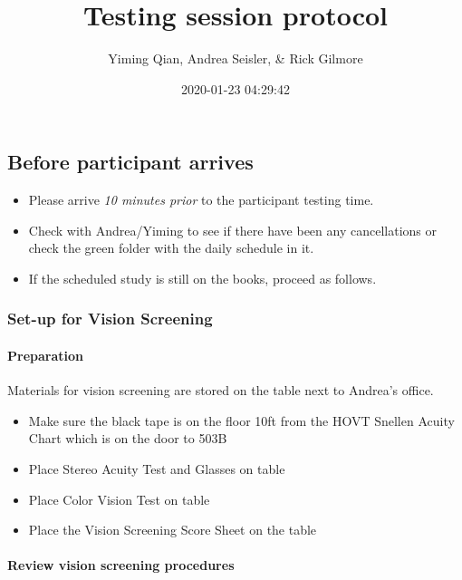 \documentclass[]{article}
\title{Testing session protocol}
\author{Yiming Qian, Andrea Seisler, \& Rick Gilmore}
\date{2020-01-23 04:29:42}
\providecommand{\tightlist}{%
  \setlength{\itemsep}{0pt}\setlength{\parskip}{0pt}}
\let\oldparagraph\paragraph
\renewcommand{\paragraph}[1]{\oldparagraph{#1}\mbox{}}
\begin{document}
\maketitle

{
\setcounter{tocdepth}{3}
\tableofcontents
}
\subsection{Before participant
arrives}\label{before-participant-arrives}

\begin{itemize}
\tightlist
\item
  Please arrive \emph{10 minutes prior} to the participant testing time.
\item
  Check with Andrea/Yiming to see if there have been any cancellations
  or check the green folder with the daily schedule in it.
\item
  If the scheduled study is still on the books, proceed as follows.
\end{itemize}

\subsubsection{Set-up for Vision
Screening}\label{set-up-for-vision-screening}

\paragraph{Preparation}\label{preparation}

Materials for vision screening are stored on the table next to Andrea's
office.

\begin{itemize}
\tightlist
\item
  Make sure the black tape is on the floor 10ft from the HOVT Snellen
  Acuity Chart which is on the door to 503B
\item
  Place Stereo Acuity Test and Glasses on table
\item
  Place Color Vision Test on table
\item
  Place the Vision Screening Score Sheet on the table
\end{itemize}

\paragraph{Review vision screening
procedures}\label{review-vision-screening-procedures}
\end{document}
